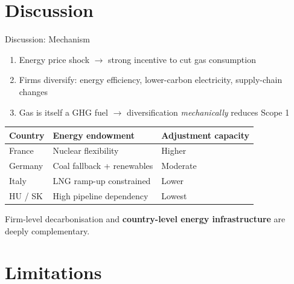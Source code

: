 \documentclass[10pt]{beamer}
\begin{document}
\section{Discussion}

\begin{frame}{Discussion: Mechanism}
  \begin{enumerate}
    \item Energy price shock $\to$ strong incentive to cut gas consumption
    \item Firms diversify: energy efficiency, lower-carbon electricity, supply-chain changes
    \item Gas is itself a GHG fuel $\to$ diversification \emph{mechanically} reduces Scope 1
  \end{enumerate}

  \vspace{0.5em}

  \begin{center}
    \small
    \begin{tabular}{lll}
      \toprule
      Country & Energy endowment & Adjustment capacity \\
      \midrule
      France & Nuclear flexibility & Higher \\
      Germany & Coal fallback + renewables & Moderate \\
      Italy & LNG ramp-up constrained & Lower \\
      HU / SK & High pipeline dependency & Lowest \\
      \bottomrule
    \end{tabular}
  \end{center}

  \vspace{0.3em}

  Firm-level decarbonisation and \textbf{country-level energy infrastructure} are deeply complementary.
\end{frame}

\section{Limitations}
\end{document}
